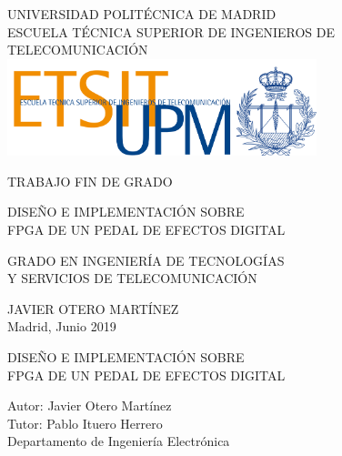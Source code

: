 \documentclass[a4paper, 11pt, oneside, openright]{report}
\begin{document}
\begin{center}
	\large UNIVERSIDAD POLITÉCNICA DE MADRID\\
	ESCUELA TÉCNICA SUPERIOR DE INGENIEROS DE TELECOMUNICACIÓN\\
	
	\includegraphics[width=9cm]{img/LOGO_ESCUELA.png}
\end{center}

\vspace*{3cm}
\begin{center}
	TRABAJO FIN DE GRADO
\end{center}

\vspace*{1.5cm}
\begin{center}
	\Huge DISEÑO E IMPLEMENTACIÓN SOBRE\\ FPGA DE UN PEDAL DE EFECTOS DIGITAL
\end{center}

\vspace*{2cm}
\begin{center}
	\Large GRADO EN INGENIERÍA DE TECNOLOGÍAS\\ Y SERVICIOS DE TELECOMUNICACIÓN
\end{center}

\vspace*{4cm}
\begin{flushright}
	\rm
	\Large	JAVIER OTERO MARTÍNEZ\\
	Madrid, Junio 2019
\end{flushright}
\thispagestyle{empty}
\newpage

\thispagestyle{empty}
\setcounter{page}{2}
\vspace*{3cm}
\begin{center}
	\Huge DISEÑO E IMPLEMENTACIÓN SOBRE\\ FPGA DE UN PEDAL DE EFECTOS DIGITAL
\end{center}
\vspace*{4cm}
\begin{center}
	\Large Autor: Javier Otero Martínez\\
	\vspace*{1.5cm}
	\Large Tutor: Pablo Ituero Herrero\\ Departamento de Ingeniería Electrónica
\end{center}
\end{document}
